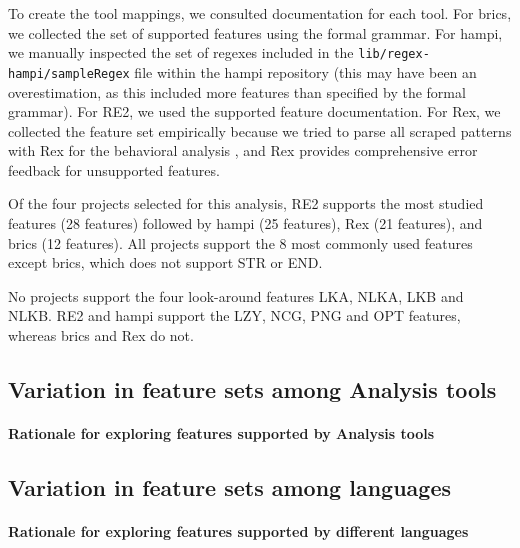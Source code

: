 To create the tool mappings, we consulted documentation for each tool. For brics, we collected the set of supported features using the formal grammar.  For hampi, we manually inspected the set of regexes included in the {\tt lib/regex-hampi/sampleRegex} file within the hampi repository (this may have been an overestimation, as this included more features than specified by the formal grammar).  For RE2, we used the  supported feature documentation.  For Rex, we collected the feature set empirically because we tried to parse all scraped patterns with Rex for the behavioral analysis
, and Rex provides comprehensive error feedback for unsupported features.

Of the four projects selected for this analysis, RE2 supports the most studied features (28 features) followed by hampi (25 features),  Rex (21 features), and brics (12 features).  All projects support the 8 most commonly used features except brics, which does not support STR or END.

No projects support the four look-around features LKA, NLKA, LKB and NLKB.  RE2 and hampi support the LZY, NCG, PNG and OPT features, whereas brics and Rex do not.

\subsection{Variation in feature sets among Analysis tools}

\paragraph{Rationale for exploring features supported by Analysis tools} 



\subsection{Variation in feature sets among languages}
\label{sec:featureSupport}

\paragraph{Rationale for exploring features supported by different languages} 

